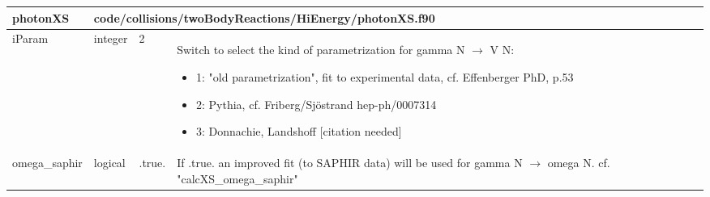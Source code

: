 \documentclass{article}
\begin{document}

\begin{longtable}{llll}
\toprule
\textbf{\large{photonXS}} & \multicolumn{3}{l}{\footnotesize{code/collisions/twoBodyReactions/HiEnergy/photonXS.f90}}\\*
\midrule
\endfirsthead
\midrule
\endhead
iParam & \begin{minipage}[t]{2cm}integer\end{minipage} & \begin{minipage}[t]{2cm}2\end{minipage} & \begin{minipage}[t]{12cm}Switch to select the kind of parametrization for gamma N $\rightarrow$ V N:\begin{itemize}\leftmargin0em\itemindent0pt\item 1: "old parametrization", fit to experimental data, cf. Effenberger PhD, p.53\item 2: Pythia, cf. Friberg/Sjöstrand hep-ph/0007314\item 3: Donnachie, Landshoff [citation needed]\end{itemize}\end{minipage}\\*
\midrule
omega\_saphir & \begin{minipage}[t]{2cm}logical\end{minipage} & \begin{minipage}[t]{2cm}.true.\end{minipage} & \begin{minipage}[t]{12cm}If .true. an improved fit (to SAPHIR data) will be used for gamma N $\rightarrow$ omega N. cf. "calcXS\_omega\_saphir"\end{minipage}\\*
\bottomrule
\end{longtable}
{ }



\end{document}
